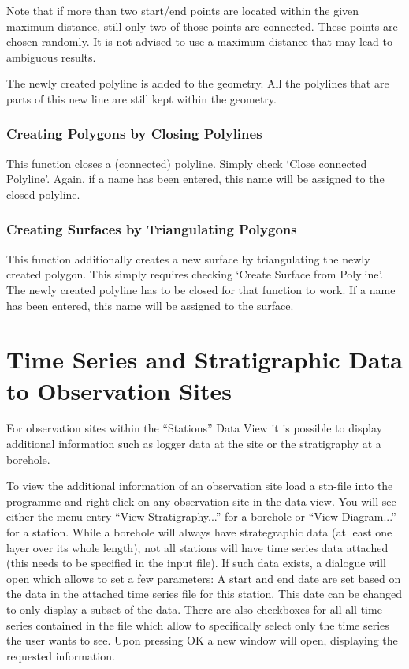 Note that if more than two start/end points are located within the given maximum distance, still only two of those points are connected. These points are chosen randomly. It is not advised to use a maximum distance that may lead to ambiguous results.

The newly created polyline is added to the geometry. All the polylines that are parts of this new line are still kept within the geometry.

\subsubsection{Creating Polygons by Closing Polylines}
This function closes a (connected) polyline. Simply check `Close connected Polyline'. Again, if a name has been entered, this name will be assigned to the closed polyline.

\subsubsection{Creating Surfaces by Triangulating Polygons}
This function additionally creates a new surface by triangulating the newly created polygon. This simply requires checking `Create Surface from Polyline'. The newly created polyline has to be closed for that function to work. If a name has been entered, this name will be assigned to the surface.


\section{Time Series and Stratigraphic Data to Observation Sites}

For observation sites within the ``Stations'' Data View it is possible to display additional information such as logger data at the site or the stratigraphy at a borehole.

To view the additional information of an observation site load a stn-file into the programme and right-click on any observation site in the data view. You will see either the menu entry ``View Stratigraphy...'' for a borehole or ``View Diagram...'' for a station. While a borehole will always have strategraphic data (at least one layer over its whole length), not all stations will have time series data attached (this needs to be specified in the input file). If such data exists, a dialogue will open which allows to set a few parameters: A start and end date are set based on the data in the attached time series file for this station. This date can be changed to only display a subset of the data. There are also checkboxes for all all time series contained in the file which allow to specifically select only the time series the user wants to see. Upon pressing OK a new window will open, displaying the requested information.

